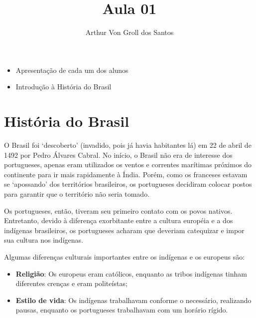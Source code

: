 \documentclass{article}
\author{Arthur Von Groll dos Santos}
\title{Aula 01}
\begin{document}
\maketitle

\begin{itemize}
    \item Apresentação de cada um dos alunos
    \item Introdução à História do Brasil
\end{itemize}

\section*{\centering História do Brasil}

O Brasil foi `descoberto' (invadido, pois já havia habitantes lá)
em 22 de abril de 1492 por Pedro Álvares Cabral. No início, o Brasil não era de interesse dos portugueses,
apenas eram utilizados os ventos e correntes marítimas próximos do continente para ir
mais rapidamente à Índia. Porém, como os franceses estavam se `apossando' dos territórios brasileiros,
os portugueses decidiram colocar postos para garantir que o território não seria tomado.

Os portugueses, então, tiveram seu primeiro contato com os povos nativos. Entretanto, devido à diferença
exorbitante entre a cultura européia e a dos indígenas brasileiros, os portugueses acharam que deveriam catequizar
e impor sua cultura nos indígenas.

Algumas diferenças culturais importantes entre os indígenas e os europeus são:

\begin{itemize}
    \item \textbf{Religião}: Os europeus eram católicos, enquanto as tribos indígenas
        tinham diferentes crenças e eram politeístas;
    \item \textbf{Estilo de vida}: Os indígenas trabalhavam conforme o necessário, realizando pausas, enquanto
        os portugueses trabalhavam com um horário rígido.
\end{itemize}
\end{document}
